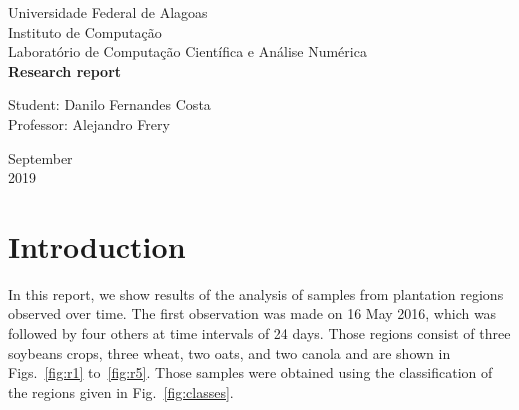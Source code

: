 \documentclass[12pt]{article}
\begin{document}

\onehalfspacing

\begin{titlepage}
\begin{center}

\Huge{Universidade Federal de Alagoas}\\
\large{Instituto de Computação}\\ 
\large{Laboratório de Computação Científica e Análise Numérica}\\ 
\vspace{220pt}
\textbf{\LARGE{Research report}}\\
\vspace{3,5cm}
\end{center}

\begin{flushleft}
\begin{tabbing}
Student: Danilo Fernandes Costa\\
Professor: Alejandro Frery\\
\end{tabbing}
\end{flushleft}
\vspace{1cm}

\begin{center}
\vspace{\fill}
September\\
2019
\end{center}
\end{titlepage}

\section{Introduction}

In this report, we show results of the analysis of samples from plantation regions observed over time.
The first observation was made on 16 May 2016, which was followed by four others at time intervals of 24 days. 
Those regions consist of three soybeans crops, three wheat, two oats, and two canola and are shown in Figs.~\ref{fig:r1} to~\ref{fig:r5}. 
Those samples were obtained using the classification of the regions given in Fig.~\ref{fig:classes}.
\end{document}
